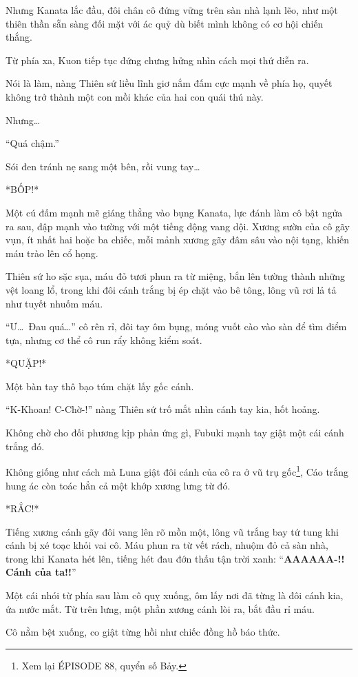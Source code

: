 \documentclass[../main.tex]{subfiles}
\begin{document}
Nhưng Kanata lắc đầu, đôi chân cô đứng vững trên sàn nhà lạnh lẽo, như một thiên thần sẵn sàng đối mặt với ác quỷ dù biết mình không có cơ hội chiến thắng.

Từ phía xa, Kuon tiếp tục đứng chưng hửng nhìn cách mọi thứ diễn ra.

Nói là làm, nàng Thiên sứ liều lĩnh giơ nắm đấm cực mạnh về phía họ, quyết không trở thành một con mồi khác của hai con quái thú này.

Nhưng\dots

``Quá chậm.''

Sói đen tránh nẹ sang một bên, rồi vung tay\dots

*BỐP!*

Một cú đấm mạnh mẽ giáng thẳng vào bụng Kanata, lực đánh làm cô bật ngửa ra sau, đập mạnh vào tường với một tiếng động vang dội. Xương sườn của cô gãy vụn, ít nhất hai hoặc ba chiếc, mỗi mảnh xương gãy đâm sâu vào nội tạng, khiến máu trào lên cổ họng.

Thiên sứ ho sặc sụa, máu đỏ tươi phun ra từ miệng, bắn lên tường thành những vệt loang lổ, trong khi đôi cánh trắng bị ép chặt vào bê tông, lông vũ rơi lả tả như tuyết nhuốm máu.

``Ư\dots\ Đau quá\dots'' cô rên rỉ, đôi tay ôm bụng, móng vuốt cào vào sàn để tìm điểm tựa, nhưng cơ thể cô run rẩy không kiểm soát.

*QUẶP!*

Một bàn tay thô bạo túm chặt lấy gốc cánh.

``K-Khoan! C-Chờ-!'' nàng Thiên sứ trố mắt nhìn cánh tay kia, hốt hoảng.

Không chờ cho đối phương kịp phản ứng gì, Fubuki mạnh tay giật một cái cánh trắng đó.

Không giống như cách mà Luna giật đôi cánh của cô ra ở vũ trụ gốc\footnote{Xem lại {\flaregothic ÉPISODE 88}, quyển số Bảy.}, Cáo trắng hung ác còn toác hẳn cả một khớp xương lưng từ đó.

*RẮC!*

Tiếng xương cánh gãy đôi vang lên rõ mồn một, lông vũ trắng bay tứ tung khi cánh bị xé toạc khỏi vai cô. Máu phun ra từ vết rách, nhuộm đỏ cả sàn nhà, trong khi Kanata hét lên, tiếng hét đau đớn thấu tận trời xanh: ``\textbf{AAAAAA-!! Cánh của ta!!}''

Một cái nhói từ phía sau làm cô quỵ xuống, ôm lấy nơi đã từng là đôi cánh kia, ứa nước mắt. Từ trên lưng, một phần xương cánh lòi ra, bắt đầu rỉ máu.

Cô nằm bệt xuống, co giật từng hồi như chiếc đồng hồ báo thức.
\end{document}
